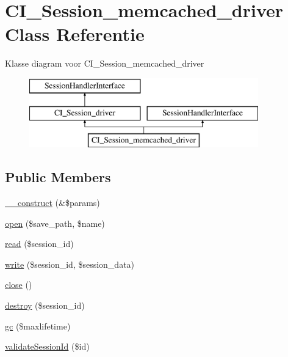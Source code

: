 \hypertarget{class_c_i___session__memcached__driver}{}\section{C\+I\+\_\+\+Session\+\_\+memcached\+\_\+driver Class Referentie}
\label{class_c_i___session__memcached__driver}
Klasse diagram voor C\+I\+\_\+\+Session\+\_\+memcached\+\_\+driver\begin{figure}[H]
\begin{center}
\leavevmode
\includegraphics[height=3.000000cm]{class_c_i___session__memcached__driver}
\end{center}
\end{figure}
\subsection*{Public Members}
\begin{DoxyCompactItemize}
\item 
\mbox{\hyperlink{class_c_i___session__memcached__driver_ac1669c73d53d6f16cf5459a1e84d39c8}{\+\_\+\+\_\+construct}} (\&\$params)
\item 
\mbox{\hyperlink{class_c_i___session__memcached__driver_a614b5cf3840833913c7a73260ed28e02}{open}} (\$save\+\_\+path, \$name)
\item 
\mbox{\hyperlink{class_c_i___session__memcached__driver_a5bbf84ebf657be4eaccc0582377c76bf}{read}} (\$session\+\_\+id)
\item 
\mbox{\hyperlink{class_c_i___session__memcached__driver_ad9d124885be93668f1dbf6aace5964f5}{write}} (\$session\+\_\+id, \$session\+\_\+data)
\item 
\mbox{\hyperlink{class_c_i___session__memcached__driver_aa69c8bf1f1dcf4e72552efff1fe3e87e}{close}} ()
\item 
\mbox{\hyperlink{class_c_i___session__memcached__driver_aaec5812f6b4eb6835f88d3baa06a002a}{destroy}} (\$session\+\_\+id)
\item 
\mbox{\hyperlink{class_c_i___session__memcached__driver_a57aff7ee0656d8aa75d545fb8b3ae35d}{gc}} (\$maxlifetime)
\item 
\mbox{\hyperlink{class_c_i___session__memcached__driver_a7bee5f3a24cb93e5a7fc371e05046f20}{validate\+Session\+Id}} (\$id)
\end{DoxyCompactItemize}
